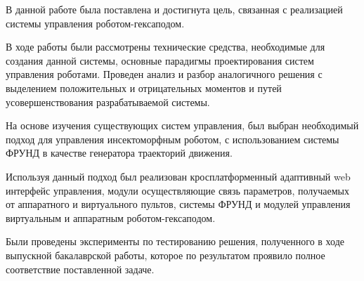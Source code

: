 
В данной работе была поставлена и достигнута цель, связанная с реализацией системы управления роботом-гексаподом.

В ходе работы были рассмотрены технические средства, необходимые для создания данной системы, основные парадигмы проектирования систем управления роботами. Проведен анализ и разбор аналогичного решения с выделением положительных и отрицательных моментов и путей усовершенствования разрабатываемой системы.

На основе изучения существующих систем управления, был выбран необходимый подход для управления инсектоморфным роботом, с использованием системы ФРУНД в качестве генератора траекторий движения.

Используя данный подход был реализован кросплатформенный адаптивный web интерфейс управления, модули осуществляющие связь параметров, получаемых от аппаратного и виртуального пультов, системы ФРУНД и модулей управления виртуальным и аппаратным роботом-гексаподом.

Были проведены эксперименты по тестированию решения, полученного в ходе выпускной бакалаврской работы, которое по результатом проявило полное соответствие поставленной задаче.